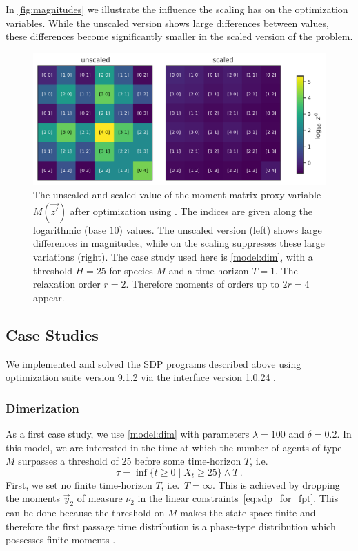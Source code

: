 In \autoref{fig:magnitudes} we illustrate the influence the scaling has on the
optimization variables. While the unscaled version shows large differences
between values, these differences become significantly smaller in the scaled version
of the problem.
\begin{figure}[htb]
    \centering
    \includegraphics[width=\textwidth]{gfx/magnitudes.pdf}
	\caption[Moment matrix scaling]{The unscaled and scaled value of the moment matrix proxy variable
    $M(\vec{z'})$ after optimization using . The indices are given along the
    logarithmic (base $10$) values. The unscaled version (left) shows large
    differences in magnitudes, while on the scaling suppresses
    these large variations (right). The case study used here is \autoref{model:dim},
    with a threshold $H=25$ for species $M$ and a time-horizon $T=1$. The
    relaxation order $r=2$. Therefore moments of orders up to $2r=4$ appear.}
    \label{fig:magnitudes}
\end{figure}


\subsection{Case Studies}
We implemented and solved the \ac{SDP} programs described above using optimization suite  version 9.1.2 \parencite{mosek} via the 
interface version 1.0.24 \parencite{cvxpy}.

\subsubsection*{Dimerization}
As a first case study, we use \autoref{model:dim} with parameters $\lambda=100$ and $\delta=0.2$.
In this model, we are interested in the time at which the number of agents of type $M$
surpasses a threshold of $25$ before some time-horizon $T$,
i.e.\ \[
	\tau=\inf\{t\geq 0\mid X_t \geq 25\}\land T\,.
\]
First, we set no finite time-horizon $T$, i.e.\ $T=\infty$.
This is achieved by dropping the moments $\vec y_2$
of measure $\nu_2$ in the linear constraints~\eqref{eq:sdp_for_fpt}.
This can be done because the threshold on $M$ makes the state-space finite
and therefore the first passage time distribution is a phase-type distribution
which possesses finite moments \parencite[][Chapter 7.6]{stewart2009probability}.

